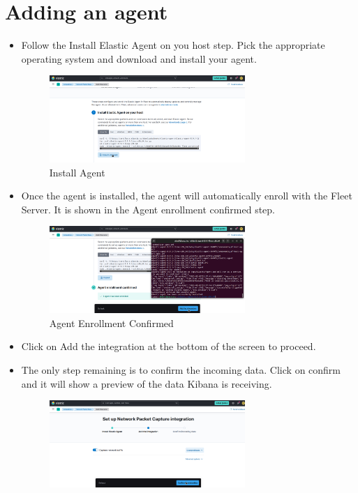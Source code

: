 \documentclass{report}
\begin{document}
\section{Adding an agent}
\begin{itemize}
	\item Follow the Install Elastic Agent on you host step. 
	Pick the appropriate operating system and download and install your agent.
	\begin{figure}
		\centering
		\includegraphics[width=0.7\textwidth]{Images/install-elastic-agent.png}
		\caption{Install Agent}
		\label{fig:Install Agent}
	\end{figure}
	\item Once the agent is installed, the agent will automatically enroll with the Fleet Server.
	It is shown in the Agent enrollment confirmed step.
	\begin{figure}
		\centering
		\includegraphics[width=0.7\textwidth]{Images/agent-enrollment-confirmed.png}
		\caption{Agent Enrollment Confirmed}
		\label{fig:Agent Enrollment Confirmed}
	\end{figure}
	\item Click on Add the integration at the bottom of the screen to proceed.
	\item The only step remaining is to confirm the incoming data. Click on confirm and it will show a preview of the 
	data Kibana is receiving.
	\begin{figure}
		\centering
		\includegraphics[width=0.7\textwidth]{Images/confirm-incoming-data.png}

\end{figure}
\end{itemize}
\end{document}

